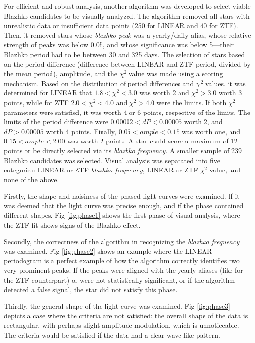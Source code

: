\documentclass{aa}
\begin{document}
For efficient and robust analysis, another algorithm was developed to select viable Blazhko candidates to be visually analyzed. 
The algorithm removed all stars with unrealistic data or insufficient data points (250 for LINEAR and 40 for ZTF). 
Then, it removed stars whose \textit{blazhko peak} was a yearly/daily alias, whose relative strength of peaks was below 0.05, and whose significance was below 5—their Blazhko period had to be between 30 and 325 days. 
The selection of stars based on the period difference (difference between LINEAR and ZTF period, divided by the mean period), amplitude, and the $\chi^2$ value was made using a scoring mechanism. 
Based on the distribution of period differences and $\chi^2$ values, it was determined for LINEAR that $1.8<\chi^2<3.0$ was worth 2 and $\chi^2>3.0$ worth 3 points, while for ZTF $2.0<\chi^2<4.0$ and $\chi^2>4.0$ were the limits. If both $\chi^2$ parameters were satisfied, it was worth 4 or 6 points, respective of the limits. 
The limits of the period difference were $0.00002 < dP < 0.00005$ worth 2, and $dP > 0.00005$ worth 4 points. Finally, $0.05 < ample < 0.15$ was worth one, and $0.15 < ample < 2.00$ was worth 2 points. 
A star could score a maximum of 12 points or be directly selected via its \textit{blazhko frequency}.
A smaller sample of 239 Blazhko candidates was selected. Visual analysis was separated into five categories: LINEAR or ZTF \textit{blazhko frequency}, LINEAR or ZTF $\chi^2$ value, and none of the above. 

Firstly, the shape and noisiness of the phased light curves were examined. 
If it was deemed that the light curve was precise enough, and if the phase contained different shapes. 
Fig \ref{fig:phase1} shows the first phase of visual analysis, where the ZTF fit shows signs of the Blazhko effect.

Secondly, the correctness of the algorithm in recognizing the \textit{blazhko frequency} was examined. Fig \ref{fig:phase2} shows an example where the LINEAR periodogram is a perfect example of how the algorithm correctly identifies two very prominent peaks. If the peaks were aligned with the yearly aliases (like for the ZTF counterpart) or were not statistically significant, or if the algorithm detected a false signal, the star did not satisfy this phase.

Thirdly, the general shape of the light curve was examined. Fig \ref{fig:phase3} depicts a case where the criteria are not satisfied: the overall shape of the data is rectangular, with perhaps slight amplitude modulation, which is unnoticeable. The criteria would be satisfied if the data had a clear wave-like pattern.
    
\end{document}
